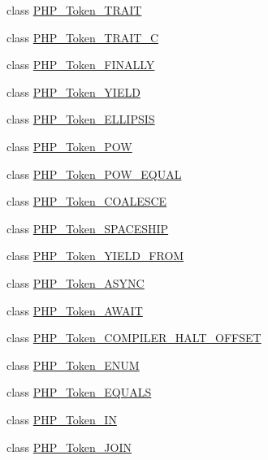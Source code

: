 \begin{DoxyCompactItemize}
\item 
class \mbox{\hyperlink{class_p_h_p___token___t_r_a_i_t}{P\+H\+P\+\_\+\+Token\+\_\+\+T\+R\+A\+IT}}
\item 
class \mbox{\hyperlink{class_p_h_p___token___t_r_a_i_t___c}{P\+H\+P\+\_\+\+Token\+\_\+\+T\+R\+A\+I\+T\+\_\+C}}
\item 
class \mbox{\hyperlink{class_p_h_p___token___f_i_n_a_l_l_y}{P\+H\+P\+\_\+\+Token\+\_\+\+F\+I\+N\+A\+L\+LY}}
\item 
class \mbox{\hyperlink{class_p_h_p___token___y_i_e_l_d}{P\+H\+P\+\_\+\+Token\+\_\+\+Y\+I\+E\+LD}}
\item 
class \mbox{\hyperlink{class_p_h_p___token___e_l_l_i_p_s_i_s}{P\+H\+P\+\_\+\+Token\+\_\+\+E\+L\+L\+I\+P\+S\+IS}}
\item 
class \mbox{\hyperlink{class_p_h_p___token___p_o_w}{P\+H\+P\+\_\+\+Token\+\_\+\+P\+OW}}
\item 
class \mbox{\hyperlink{class_p_h_p___token___p_o_w___e_q_u_a_l}{P\+H\+P\+\_\+\+Token\+\_\+\+P\+O\+W\+\_\+\+E\+Q\+U\+AL}}
\item 
class \mbox{\hyperlink{class_p_h_p___token___c_o_a_l_e_s_c_e}{P\+H\+P\+\_\+\+Token\+\_\+\+C\+O\+A\+L\+E\+S\+CE}}
\item 
class \mbox{\hyperlink{class_p_h_p___token___s_p_a_c_e_s_h_i_p}{P\+H\+P\+\_\+\+Token\+\_\+\+S\+P\+A\+C\+E\+S\+H\+IP}}
\item 
class \mbox{\hyperlink{class_p_h_p___token___y_i_e_l_d___f_r_o_m}{P\+H\+P\+\_\+\+Token\+\_\+\+Y\+I\+E\+L\+D\+\_\+\+F\+R\+OM}}
\item 
class \mbox{\hyperlink{class_p_h_p___token___a_s_y_n_c}{P\+H\+P\+\_\+\+Token\+\_\+\+A\+S\+Y\+NC}}
\item 
class \mbox{\hyperlink{class_p_h_p___token___a_w_a_i_t}{P\+H\+P\+\_\+\+Token\+\_\+\+A\+W\+A\+IT}}
\item 
class \mbox{\hyperlink{class_p_h_p___token___c_o_m_p_i_l_e_r___h_a_l_t___o_f_f_s_e_t}{P\+H\+P\+\_\+\+Token\+\_\+\+C\+O\+M\+P\+I\+L\+E\+R\+\_\+\+H\+A\+L\+T\+\_\+\+O\+F\+F\+S\+ET}}
\item 
class \mbox{\hyperlink{class_p_h_p___token___e_n_u_m}{P\+H\+P\+\_\+\+Token\+\_\+\+E\+N\+UM}}
\item 
class \mbox{\hyperlink{class_p_h_p___token___e_q_u_a_l_s}{P\+H\+P\+\_\+\+Token\+\_\+\+E\+Q\+U\+A\+LS}}
\item 
class \mbox{\hyperlink{class_p_h_p___token___i_n}{P\+H\+P\+\_\+\+Token\+\_\+\+IN}}
\item 
class \mbox{\hyperlink{class_p_h_p___token___j_o_i_n}{P\+H\+P\+\_\+\+Token\+\_\+\+J\+O\+IN}}

\end{DoxyCompactItemize}
